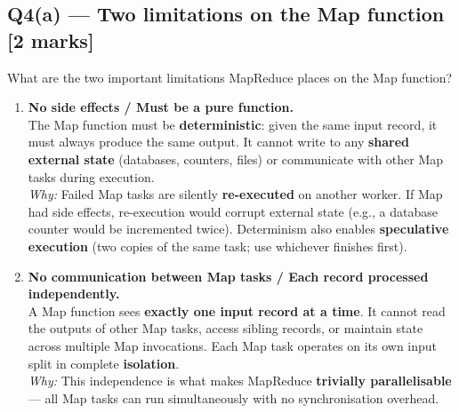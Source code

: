 \documentclass[12pt, a4paper]{article}
\newenvironment{qbox}{\begin{mdframed}[style=qframe]}{\end{mdframed}}
\newenvironment{solbox}{\begin{mdframed}[style=solframe]}{\end{mdframed}}
\newcommand{\qmarks}[1]{\hfill\textbf{\color{orange!70!black}[#1 marks]}}
\begin{document}
\subsection{Q4(a) --- Two limitations on the Map function
  \texorpdfstring{\qmarks{2}}{}}
\begin{qbox}What are the two important limitations MapReduce places on the Map function?\end{qbox}
\begin{solbox}
\begin{enumerate}[leftmargin=1.6cm, itemsep=5pt]
  \item \textbf{No side effects / Must be a pure function.}\\
    The Map function must be \textbf{deterministic}: given the same input record, it must always
    produce the same output. It cannot write to any \textbf{shared external state} (databases,
    counters, files) or communicate with other Map tasks during execution.\\
    \textit{Why:} Failed Map tasks are silently \textbf{re-executed} on another worker. If Map had
    side effects, re-execution would corrupt external state (e.g., a database counter would be
    incremented twice). Determinism also enables \textbf{speculative execution} (two copies of the
    same task; use whichever finishes first).

  \item \textbf{No communication between Map tasks / Each record processed independently.}\\
    A Map function sees \textbf{exactly one input record at a time}. It cannot read the outputs of
    other Map tasks, access sibling records, or maintain state across multiple Map invocations.
    Each Map task operates on its own input split in complete \textbf{isolation}.\\
    \textit{Why:} This independence is what makes MapReduce \textbf{trivially parallelisable} ---
    all Map tasks can run simultaneously with no synchronisation overhead.
\end{enumerate}
\end{solbox}

\end{document}
